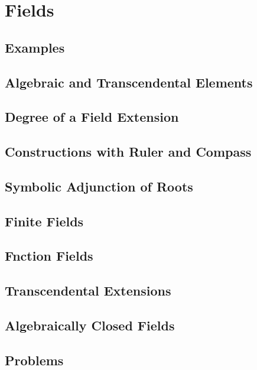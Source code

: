 \chapter{Fields}
\section{Examples}
\section{Algebraic and Transcendental Elements}
\section{Degree of a Field Extension}
\section{Constructions with Ruler and Compass}
\section{Symbolic Adjunction of Roots}
\section{Finite Fields}
\section{Fnction Fields}
\section{Transcendental Extensions}
\section{Algebraically Closed Fields}
\section{Problems}